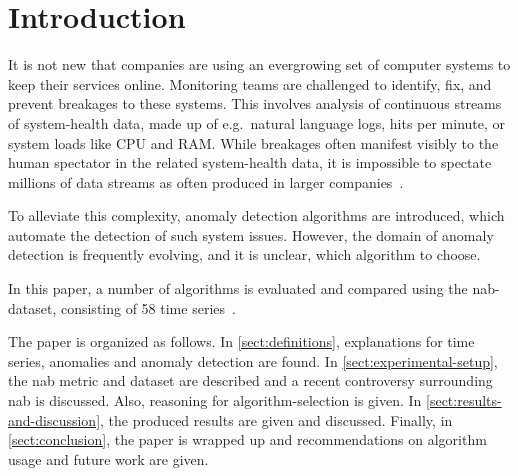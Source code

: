\section{Introduction}
It is not new that companies are using an evergrowing set of computer systems
to keep their services online. Monitoring teams are challenged to identify, fix,
and prevent breakages to these systems. This involves analysis of continuous
streams of system-health data, made up of e.g.\ natural language logs, hits per
minute, or system loads like CPU and RAM\@. While breakages often manifest visibly
to the human spectator in the related system-health data, it is impossible to spectate
millions of data streams as often produced in larger companies~\cite[cf.][]{Zhu.2017}.

To alleviate this complexity, anomaly detection algorithms are introduced,
which automate the detection of such system issues. However, the domain of
anomaly detection is frequently evolving, and it is unclear, which algorithm to
choose.

In this paper, a number of algorithms is evaluated and compared using the
\gls{nab}-dataset, consisting of 58 time series~\cite{Lavin.2015}.

The paper is organized as follows. In \cref{sect:definitions}, explanations for
time series, anomalies and anomaly detection are found. In \cref{sect:experimental-setup},
the \gls{nab} metric and dataset are described and a recent controversy surrounding
\gls{nab} is discussed. Also, reasoning for algorithm-selection is given.
In \cref{sect:results-and-discussion}, the produced results are given and discussed.
Finally, in \cref{sect:conclusion}, the paper is wrapped up and recommendations
on algorithm usage and future work are given.
